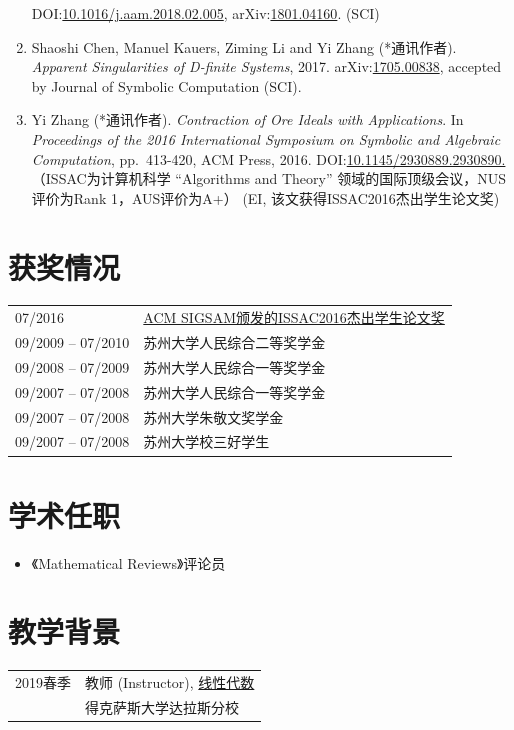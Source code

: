 \documentclass[a4paper,12pt]{article}
\newcommand{\red}{\color{red}}
\begin{document}
\begin{CJK*}{UTF8}{gbsn}
\begin{enumerate}
DOI:\href{http://dx.doi.org/10.1016/j.aam.2018.02.005}{10.1016/j.aam.2018.02.005},
arXiv:\href{https://arxiv.org/abs/1801.04160}{1801.04160}. (SCI) 
\item Shaoshi Chen, Manuel Kauers, Ziming Li and Yi Zhang (*通讯作者). {\em Apparent Singularities of D-finite Systems}, 2017. 
 arXiv:\href{http://arxiv.org/abs/1705.00838}{1705.00838}, accepted by Journal of Symbolic Computation (SCI).
\item Yi Zhang (*通讯作者). {\em Contraction of Ore Ideals with Applications}. 
In {\em Proceedings of the 2016 International Symposium on Symbolic and Algebraic Computation}, 
pp.\ 413-420, ACM Press, 2016. DOI:\href{http://dl.acm.org/citation.cfm?id=2930890}{10.1145/2930889.2930890.} 
{\red （ISSAC为计算机科学 
“Algorithms and Theory”
领域的国际顶级会议，NUS评价为Rank 1，AUS评价为A+） (EI, 该文获得ISSAC2016杰出学生论文奖)} 
\end{enumerate}

\section*{\Large{获奖情况}}
\begin{tabular}{@{}p{1.4in}p{4in}}
07/2016               & \href{https://www.sigsam.org/Awards/ISSACAwards.html}{ACM SIGSAM颁发的ISSAC2016杰出学生论文奖} \\
09/2009 -- 07/2010    & 苏州大学人民综合二等奖学金\\
09/2008 -- 07/2009    & 苏州大学人民综合一等奖学金 \\
09/2007 -- 07/2008    & 苏州大学人民综合一等奖学金 \\ 
09/2007 -- 07/2008    & 苏州大学朱敬文奖学金 \\
09/2007 -- 07/2008    & 苏州大学校三好学生
\end{tabular}

\section*{学术任职}
\begin{itemize}
 \item 《Mathematical Reviews》评论员
\end{itemize}

\section*{教学背景}
\begin{tabular}{@{}p{1.4in}p{4in}}
2019春季           & 教师 (Instructor), \href{https://yzhang1616.github.io/algebra19spring/algebra.html}{线性代数} \\
                      & 得克萨斯大学达拉斯分校
\end{tabular}



\end{CJK*}
\end{document}
